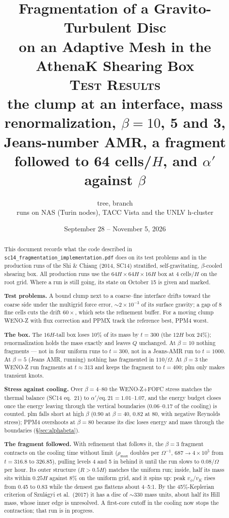 \documentclass[11pt]{article}
\title{Fragmentation of a Gravito-Turbulent Disc\\
       on an Adaptive Mesh in the AthenaK Shearing Box\\[0.4em]
       \large \textsc{Test Results}\\
       \large the clump at an interface, mass renormalization, $\beta = 10$, 5 and 3,
       Jeans-number AMR, a fragment followed to 64 cells/$H$,
       and $\alpha'$ against $\beta$}
\author{\code{athenak-multigrid} tree, branch \code{dust-multigrid}\\
        \small runs on NAS (Turin nodes), TACC Vista and the UNLV h-cluster}
\date{September 28 -- November 5, 2026}
\newcommand{\file}[1]{\texttt{\small #1}}
\newcommand{\Om}{\Omega}
\begin{document}
\maketitle

\begin{abstract}
\noindent
This document records what the code described in
\file{sc14\_fragmentation\_implementation.pdf} does on its test problems and in the
production runs of the Shi \& Chiang (2014, SC14) stratified, self-gravitating,
$\beta$-cooled shearing box. All production runs use the $64H\times64H\times16H$ box at
4 cells/$H$ on the root grid. Where a run is still going, its state on October 15 is
given and marked.

\textbf{Test problems.} A bound clump next to a coarse--fine interface drifts toward the
coarse side under the multigrid force error, $\sim2\times10^{-3}$ of its surface
gravity; a gap of 8 fine cells cuts the drift $60\times$, which sets the refinement
buffer. For a moving clump WENO-Z with flux correction and PPMX track the reference
best, PPM4 worst.

\textbf{The box.} The $16H$-tall box loses 10\% of its mass by $t = 300$ (the $12H$
box 24\%); renormalization holds the mass exactly and leaves $Q$ unchanged. At
$\beta = 10$ nothing fragments --- not in four uniform runs to $t = 300$, not in a
Jeans-AMR run to $t = 1000$. At $\beta = 5$ (Jeans AMR, running) nothing has
fragmented in $110/\Om$. At $\beta = 3$ the WENO-Z run fragments at $t\approx313$ and
keeps the fragment to $t = 400$; plm only makes transient knots.

\textbf{Stress against cooling.} Over $\beta = 4$--80 the WENO-Z+FOFC stress matches the
thermal balance (SC14 eq.~21) to $\alpha'/\mathrm{eq.\,21} = 1.01$--1.07, and the energy budget
closes once the energy leaving through the vertical boundaries ($0.06$--$0.17$ of the
cooling) is counted. plm falls short at high $\beta$ (0.90 at $\beta = 40$, 0.82 at 80, with
negative Reynolds stress); PPM4 overshoots at $\beta = 80$ because its disc loses energy
and mass through the boundaries (\S\ref{sec:alphabeta}).

\textbf{The fragment followed.} With refinement that follows it, the $\beta = 3$
fragment contracts on the cooling time without limit ($\rho_{\max}$ doubles per
$\Om^{-1}$, $687\to4\times10^5$ from $t = 316.8$ to 326.85), pulling levels 4 and 5 in
behind it until the run slows to $0.08/\Om$ per hour. Its outer structure ($R > 0.5H$)
matches the uniform run; inside, half its mass sits within $0.25H$ against 8\% on the
uniform grid, and it spins up: peak $v_\phi/v_K$ rises from 0.45 to 0.83 while the
densest gas flattens about 4--5:1. By the 45\%-Keplerian criterion of Szulágyi et al.\
(2017) it has a disc of $\sim330$ mass units, about half its Hill mass, whose inner
edge is unresolved. A first-core cutoff in the cooling now stops the contraction; that
run is in progress.
\end{abstract}
\end{document}
